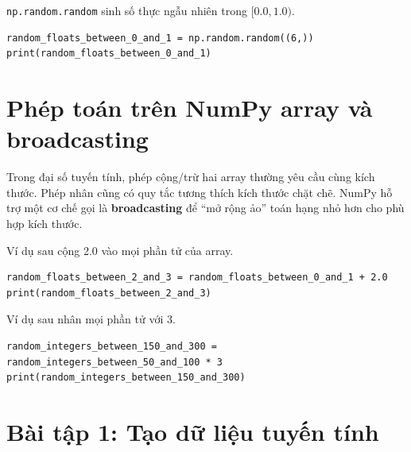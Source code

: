 \documentclass[12pt,a4paper]{article}
\begin{document}
\begin{phuongphap}[title={Số thực ngẫu nhiên bằng \texttt{np.random.random}}]
\texttt{np.random.random} sinh số thực ngẫu nhiên trong \([0.0, 1.0)\).
\end{phuongphap}

\begin{lstlisting}
random_floats_between_0_and_1 = np.random.random((6,))
print(random_floats_between_0_and_1)
\end{lstlisting}

\section{Phép toán trên NumPy array và broadcasting}

\begin{dongco}[title={Vì sao cần broadcasting?}]
Trong đại số tuyến tính, phép cộng/trừ hai array thường yêu cầu cùng kích thước.
Phép nhân cũng có quy tắc tương thích kích thước chặt chẽ.
NumPy hỗ trợ một cơ chế gọi là \textbf{broadcasting} để ``mở rộng ảo'' toán hạng nhỏ hơn cho phù hợp kích thước.
\end{dongco}

\begin{phuongphap}[title={Cộng một hằng số (broadcasting)}]
Ví dụ sau cộng 2.0 vào mọi phần tử của array.
\end{phuongphap}

\begin{lstlisting}
random_floats_between_2_and_3 = random_floats_between_0_and_1 + 2.0
print(random_floats_between_2_and_3)
\end{lstlisting}

\begin{phuongphap}[title={Nhân với một hằng số (broadcasting)}]
Ví dụ sau nhân mọi phần tử với 3.
\end{phuongphap}

\begin{lstlisting}
random_integers_between_150_and_300 = random_integers_between_50_and_100 * 3
print(random_integers_between_150_and_300)
\end{lstlisting}

\section{Bài tập 1: Tạo dữ liệu tuyến tính}
\end{document}
